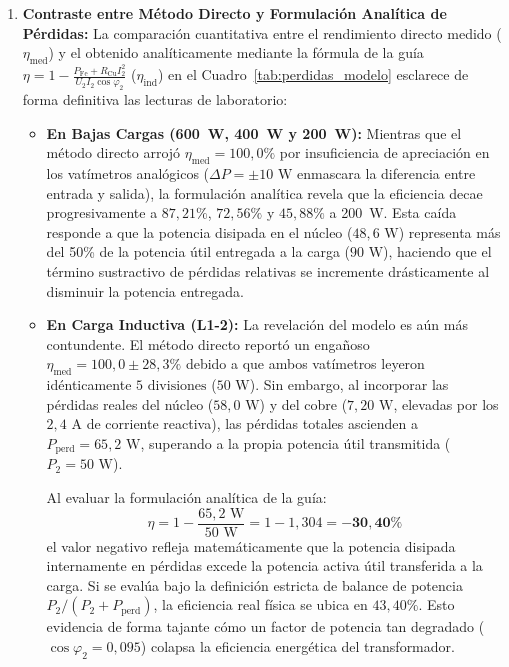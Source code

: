 \begin{enumerate}
    \item \textbf{Contraste entre Método Directo y Formulación Analítica de Pérdidas:}
    La comparación cuantitativa entre el rendimiento directo medido ($\eta_{\text{med}}$) y el obtenido analíticamente mediante la fórmula de la guía $\eta = 1 - \frac{P_{\text{Fe}} + R_{\text{Cu}} I_2^2}{U_2 I_2 \cos\varphi_2}$ ($\eta_{\text{ind}}$) en el Cuadro~\ref{tab:perdidas_modelo} esclarece de forma definitiva las lecturas de laboratorio:
    \begin{itemize}
        \item \textbf{En Bajas Cargas (600~W, 400~W y 200~W):} Mientras que el método directo arrojó $\eta_{\text{med}} = 100{,}0\%$ por insuficiencia de apreciación en los vatímetros analógicos ($\Delta P = \pm 10\text{ W}$ enmascara la diferencia entre entrada y salida), la formulación analítica revela que la eficiencia decae progresivamente a $87{,}21\%$, $72{,}56\%$ y $45{,}88\%$ a 200~W. Esta caída responde a que la potencia disipada en el núcleo ($48{,}6\text{ W}$) representa más del 50\% de la potencia útil entregada a la carga ($90\text{ W}$), haciendo que el término sustractivo de pérdidas relativas se incremente drásticamente al disminuir la potencia entregada.
        \item \textbf{En Carga Inductiva (L1-2):} La revelación del modelo es aún más contundente. El método directo reportó un engañoso $\eta_{\text{med}} = 100{,}0 \pm 28{,}3\%$ debido a que ambos vatímetros leyeron idénticamente $5\text{ divisiones}$ ($50\text{ W}$). Sin embargo, al incorporar las pérdidas reales del núcleo ($58{,}0\text{ W}$) y del cobre ($7{,}20\text{ W}$, elevadas por los $2{,}4\text{ A}$ de corriente reactiva), las pérdidas totales ascienden a $P_{\text{perd}} = 65{,}2\text{ W}$, superando a la propia potencia útil transmitida ($P_2 = 50\text{ W}$). 
        
        Al evaluar la formulación analítica de la guía:
        \begin{equation}
            \eta = 1 - \frac{65{,}2\text{ W}}{50\text{ W}} = 1 - 1{,}304 = \mathbf{-30{,}40\%}
        \end{equation}
        el valor negativo refleja matemáticamente que la potencia disipada internamente en pérdidas excede la potencia activa útil transferida a la carga. Si se evalúa bajo la definición estricta de balance de potencia $P_2 / (P_2 + P_{\text{perd}})$, la eficiencia real física se ubica en $43{,}40\%$. Esto evidencia de forma tajante cómo un factor de potencia tan degradado ($\cos\varphi_2 = 0{,}095$) colapsa la eficiencia energética del transformador.
    \end{itemize}
\end{enumerate}

